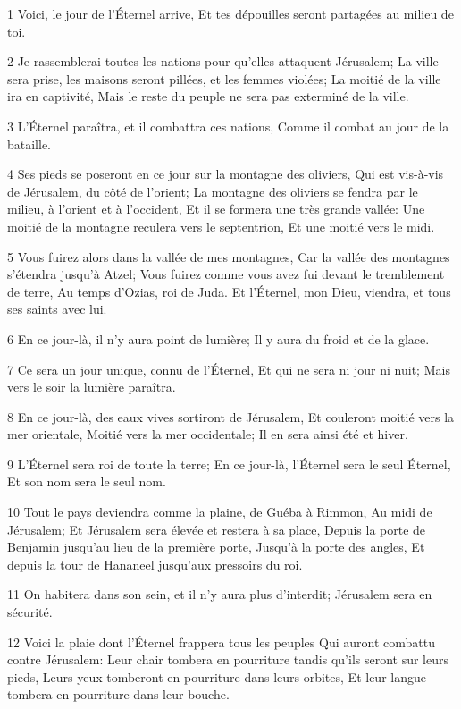 \par 1 Voici, le jour de l'Éternel arrive, Et tes dépouilles seront partagées au milieu de toi.
\par 2 Je rassemblerai toutes les nations pour qu'elles attaquent Jérusalem; La ville sera prise, les maisons seront pillées, et les femmes violées; La moitié de la ville ira en captivité, Mais le reste du peuple ne sera pas exterminé de la ville.
\par 3 L'Éternel paraîtra, et il combattra ces nations, Comme il combat au jour de la bataille.
\par 4 Ses pieds se poseront en ce jour sur la montagne des oliviers, Qui est vis-à-vis de Jérusalem, du côté de l'orient; La montagne des oliviers se fendra par le milieu, à l'orient et à l'occident, Et il se formera une très grande vallée: Une moitié de la montagne reculera vers le septentrion, Et une moitié vers le midi.
\par 5 Vous fuirez alors dans la vallée de mes montagnes, Car la vallée des montagnes s'étendra jusqu'à Atzel; Vous fuirez comme vous avez fui devant le tremblement de terre, Au temps d'Ozias, roi de Juda. Et l'Éternel, mon Dieu, viendra, et tous ses saints avec lui.
\par 6 En ce jour-là, il n'y aura point de lumière; Il y aura du froid et de la glace.
\par 7 Ce sera un jour unique, connu de l'Éternel, Et qui ne sera ni jour ni nuit; Mais vers le soir la lumière paraîtra.
\par 8 En ce jour-là, des eaux vives sortiront de Jérusalem, Et couleront moitié vers la mer orientale, Moitié vers la mer occidentale; Il en sera ainsi été et hiver.
\par 9 L'Éternel sera roi de toute la terre; En ce jour-là, l'Éternel sera le seul Éternel, Et son nom sera le seul nom.
\par 10 Tout le pays deviendra comme la plaine, de Guéba à Rimmon, Au midi de Jérusalem; Et Jérusalem sera élevée et restera à sa place, Depuis la porte de Benjamin jusqu'au lieu de la première porte, Jusqu'à la porte des angles, Et depuis la tour de Hananeel jusqu'aux pressoirs du roi.
\par 11 On habitera dans son sein, et il n'y aura plus d'interdit; Jérusalem sera en sécurité.
\par 12 Voici la plaie dont l'Éternel frappera tous les peuples Qui auront combattu contre Jérusalem: Leur chair tombera en pourriture tandis qu'ils seront sur leurs pieds, Leurs yeux tomberont en pourriture dans leurs orbites, Et leur langue tombera en pourriture dans leur bouche.
